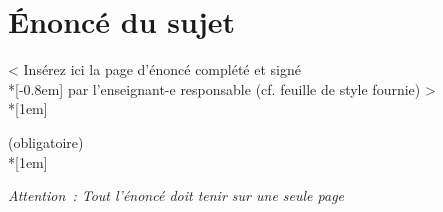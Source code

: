 \thispagestyle{noheader}
\chapter*{Énoncé du sujet} %
\thispagestyle{noheader}

\vspace{118pt}

\begin{center}
	{\Large < Insérez ici la page d’énoncé complété et signé\\*[-0.8em]
	par l’enseignant-e responsable (cf. feuille de style fournie) >\\*[1em]
	
	(obligatoire)\\*[1em]
	
	\textit{Attention : Tout l’énoncé doit tenir sur une seule page}}
\end{center}